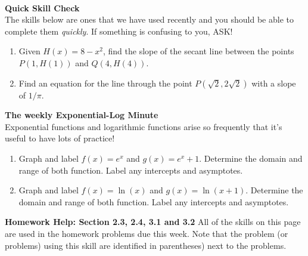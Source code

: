 \documentclass[11pt,fleqn]{article}
\begin{document}
\renewcommand{\headrulewidth}{0pt}
\newcommand{\blank}[1]{\rule{#1}{0.75pt}}
\newcommand{\bc}{\begin{center}}
\newcommand{\ec}{\end{center}}
\renewcommand{\d}{\displaystyle}

\vspace*{-0.7in}

\begin{center}
  \large
  \\
\end{center}
 
 \noindent\textbf{Quick Skill Check}\\
 The skills below are ones that we have used recently and you should be able to complete them \emph{quickly}. If something is confusing to you, ASK!\\
 
 \begin{enumerate}
 \item Given $H(x)=8-x^2$, find the slope of the secant line between the points $P(1,H(1))$ and $Q(4,H(4)).$\\
 \vfill
 \item Find an equation for the line through the point $P(\sqrt{2}, 2 \sqrt{2})$ with a slope of $1/\pi$. 
 \vfill
 \end{enumerate}
 \noindent\textbf{The weekly Exponential-Log Minute}\\
 Exponential functions and logarithmic functions arise so frequently that it's useful to have lots of practice!
 \begin{enumerate}
 \item Graph and label $f(x)=e^x$ and $g(x)=e^x +1.$ Determine the domain and range of both function. Label any intercepts and asymptotes.
 \vfill
 \item Graph and label $f(x)=\ln(x)$ and $g(x)=\ln(x+1).$ Determine the domain and range of both function. Label any intercepts and asymptotes.
 \vfill
 \end{enumerate}
 \newpage
 \noindent\textbf{Homework Help: Section 2.3, 2.4, 3.1 and 3.2}
 All of the skills on this page are used in the homework problems due this week. Note that the problem (or problems) using this skill are identified in parentheses) next to the problems. \\
\end{document}
